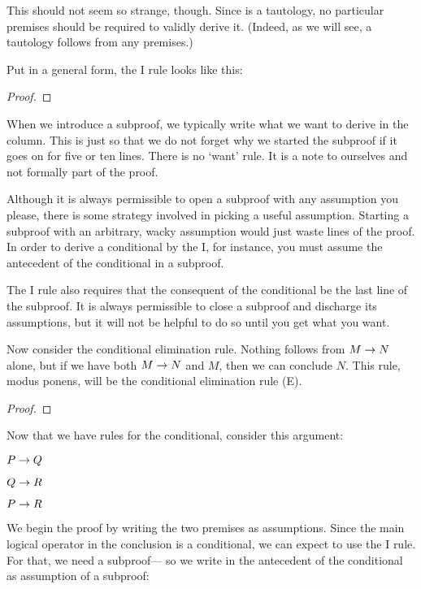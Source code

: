 This should not seem so strange, though. Since \eif{} is a tautology, no particular premises should be required to validly derive it. (Indeed, as we will see, a tautology follows from any premises.)

Put in a general form, the {\eif}I rule looks like this:

\begin{proof}
	\open
		 
	\close
\end{proof}

When we introduce a subproof, we typically write what we want to derive in the column. This is just so that we do not forget why we started the subproof if it goes on for five or ten lines. There is no `want' rule. It is a note to ourselves and not formally part of the proof.

Although it is always permissible to open a subproof with any assumption you please, there is some strategy involved in picking a useful assumption. Starting a subproof with an arbitrary, wacky assumption would just waste lines of the proof. In order to derive a conditional by the {\eif}I, for instance, you must assume the antecedent of the conditional in a subproof.

The {\eif}I rule also requires that the consequent of the conditional be the last line of the subproof. It is always permissible to close a subproof and discharge its assumptions, but it will not be helpful to do so until you get what you want.

Now consider the conditional elimination rule. Nothing follows from $M\rightarrow N$ alone, but if we have both $M \rightarrow N$ and $M$, then we can conclude $N$. This rule, modus ponens, will be the conditional elimination rule ({\eif}E).

\begin{proof}
	 
\end{proof}

Now that we have rules for the conditional, consider this argument:
\label{proofHS}
\begin{earg}
\item[] $P \rightarrow Q$
\item[] $Q \rightarrow R$
\item[\therefore] $P \rightarrow R$
\end{earg}
We begin the proof by writing the two premises as assumptions. Since the main logical operator in the conclusion is a conditional, we can expect to use the {\eif}I rule. For that, we need a subproof--- so we write in the antecedent of the conditional as assumption of a subproof:

